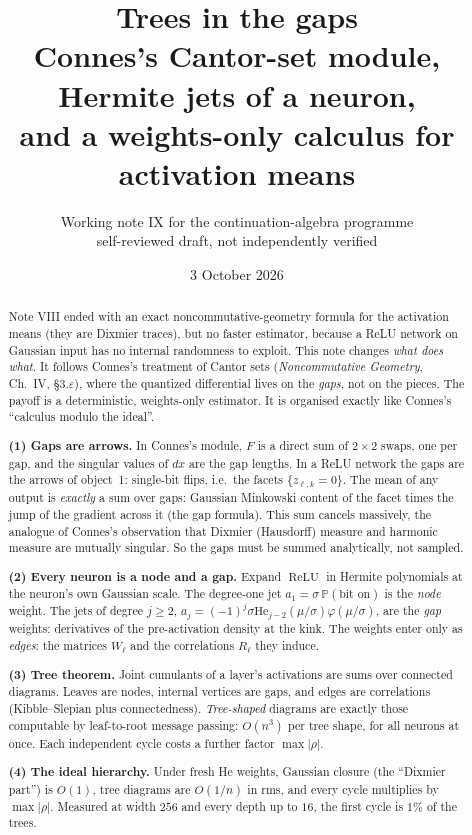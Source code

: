 \documentclass[11pt]{article}
\title{Trees in the gaps\\[4pt]
\large Connes's Cantor-set module, Hermite jets of a neuron,\\
and a weights-only calculus for activation means}
\author{Working note IX for the continuation-algebra programme\\
\small self-reviewed draft, not independently verified}
\date{3 October 2026}
\theoremstyle{definition}
\theoremstyle{remark}
\newcommand{\He}{\mathrm{He}}
\newcommand{\relu}{\operatorname{ReLU}}
\begin{document}
\maketitle

\begin{abstract}
Note VIII ended with an exact noncommutative-geometry formula for the activation means (they are Dixmier traces), but no faster estimator, because a ReLU network on Gaussian input has no internal randomness to exploit. This note changes \emph{what does what}. It follows Connes's treatment of Cantor sets (\emph{Noncommutative Geometry}, Ch.~IV, \S3.$\varepsilon$), where the quantized differential lives on the \emph{gaps}, not on the pieces. The payoff is a deterministic, weights-only estimator. It is organised exactly like Connes's ``calculus modulo the ideal''.

\textbf{(1) Gaps are arrows.} In Connes's module, $F$ is a direct sum of $2\times2$ swaps, one per gap, and the singular values of $dx$ are the gap lengths. In a ReLU network the gaps are the arrows of object~1: single-bit flips, i.e.\ the facets $\{z_{\ell,k}=0\}$. The mean of any output is \emph{exactly} a sum over gaps: Gaussian Minkowski content of the facet times the jump of the gradient across it (the gap formula). This sum cancels massively, the analogue of Connes's observation that Dixmier (Hausdorff) measure and harmonic measure are mutually singular. So the gaps must be summed analytically, not sampled.

\textbf{(2) Every neuron is a node and a gap.} Expand $\relu$ in Hermite polynomials at the neuron's own Gaussian scale. The degree-one jet $a_1=\sigma\,\mathbb P(\text{bit on})$ is the \emph{node} weight. The jets of degree $j\ge2$, $a_j=(-1)^j\sigma\He_{j-2}(\mu/\sigma)\varphi(\mu/\sigma)$, are the \emph{gap} weights: derivatives of the pre-activation density at the kink. The weights enter only as \emph{edges}: the matrices $W_\ell$ and the correlations $R_\ell$ they induce.

\textbf{(3) Tree theorem.} Joint cumulants of a layer's activations are sums over connected diagrams. Leaves are nodes, internal vertices are gaps, and edges are correlations (Kibble--Slepian plus connectedness). \emph{Tree-shaped} diagrams are exactly those computable by leaf-to-root message passing: $O(n^3)$ per tree shape, for all neurons at once. Each independent cycle costs a further factor $\max|\rho|$.

\textbf{(4) The ideal hierarchy.} Under fresh He weights, Gaussian closure (the ``Dixmier part'') is $O(1)$, tree diagrams are $O(1/n)$ in rms, and every cycle multiplies by $\max|\rho|$. Measured at width $256$ and every depth up to $16$, the first cycle is $1\%$ of the trees.


\end{abstract}
\end{document}
